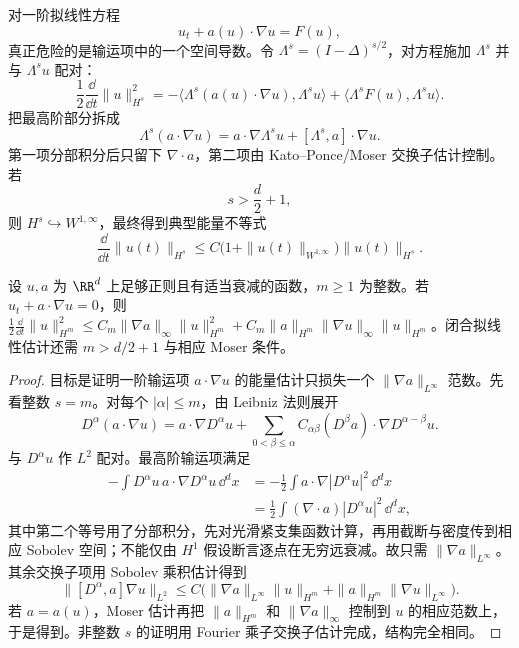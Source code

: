 对一阶拟线性方程
\[
u_t+a(u)\cdot\nabla u=F(u),
\]
真正危险的是输运项中的一个空间导数。令 $\Lambda^s=(I-\Delta)^{s/2}$，对方程施加 $\Lambda^s$ 并与 $\Lambda^su$ 配对：
\[
\frac12\frac{\dd}{\dd t}\|u\|_{H^s}^2
=
-\langle \Lambda^s(a(u)\cdot\nabla u),\Lambda^su\rangle
+\langle\Lambda^sF(u),\Lambda^su\rangle.
\]
把最高阶部分拆成
\[
\Lambda^s(a\cdot\nabla u)
=a\cdot\nabla\Lambda^su
+[\Lambda^s,a]\cdot\nabla u.
\]
第一项分部积分后只留下 $\nabla\cdot a$，第二项由 Kato--Ponce/Moser 交换子估计控制。若
\[
s>\frac d2+1,
\]
则 $H^s\hookrightarrow W^{1,\infty}$，最终得到典型能量不等式
\begin{equation}
{
\frac{\dd}{\dd t}\|u(t)\|_{H^s}
\le
C\bigl(1+\|u(t)\|_{W^{1,\infty}}\bigr)
\|u(t)\|_{H^s}
}.
\label{eq:quasilinear-sobolev-energy}
\end{equation}

\begin{proposition}
设 $u,a$ 为 $\RR^d$ 上足够正则且有适当衰减的函数，$m\ge1$ 为整数。若 $u_t+a\cdot\nabla u=0$，则 $\frac12\frac{\dd}{\dd t}\|u\|_{H^m}^2\le C_m\|\nabla a\|_\infty\|u\|_{H^m}^2+C_m\|a\|_{H^m}\|\nabla u\|_\infty\|u\|_{H^m}$。闭合拟线性估计还需 $m>d/2+1$ 与相应 Moser 条件。
\end{proposition}
\begin{proof}
目标是证明一阶输运项 $a\cdot\nabla u$ 的能量估计只损失一个 $\|\nabla a\|_{L^\infty}$ 范数。先看整数 $s=m$。对每个 $|\alpha|\le m$，由 Leibniz 法则展开
\[
D^\alpha(a\cdot\nabla u)
=a\cdot\nabla D^\alpha u
+\sum_{0<\beta\le\alpha}
C_{\alpha\beta}(D^\beta a)\cdot\nabla D^{\alpha-\beta}u.
\]
与 $D^\alpha u$ 作 $L^2$ 配对。最高阶输运项满足
\[
\begin{aligned}
-\int D^\alpha u\,
 a\cdot\nabla D^\alpha u\,\dd^dx
&=-\frac12\int a\cdot\nabla|D^\alpha u|^2\,\dd^dx\\
&=\frac12\int(\nabla\cdot a)|D^\alpha u|^2\,\dd^dx,
\end{aligned}
\]
其中第二个等号用了分部积分，先对光滑紧支集函数计算，再用截断与密度传到相应 Sobolev 空间；不能仅由 $H^1$ 假设断言逐点在无穷远衰减。故只需 $\|\nabla a\|_{L^\infty}$。其余交换子项用 Sobolev 乘积估计得到
\[
\|[D^\alpha,a]\nabla u\|_{L^2}
\le C\bigl(
\|\nabla a\|_{L^\infty}\|u\|_{H^m}
+\|a\|_{H^m}\|\nabla u\|_{L^\infty}
\bigr).
\]
若 $a=a(u)$，Moser 估计再把 $\|a\|_{H^m}$ 和 $\|\nabla a\|_\infty$ 控制到 $u$ 的相应范数上，于是得到。非整数 $s$ 的证明用 Fourier 乘子交换子估计完成，结构完全相同。
\end{proof}

